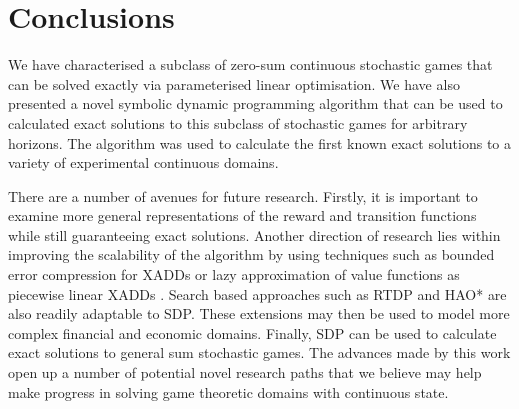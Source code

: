 \section{Conclusions}
\label{sec:conclusion}


We have characterised a subclass of zero-sum continuous stochastic
games that can be solved exactly via parameterised linear optimisation.
We have also presented a novel symbolic dynamic programming 
algorithm that can be used to calculated exact solutions to this subclass
of stochastic games for arbitrary horizons. The algorithm
was used to calculate the first known exact solutions to a variety of 
experimental continuous domains.

%

There are a number of avenues for future research. Firstly, it is important
to examine more general representations of the reward and transition functions while
still guaranteeing exact solutions. Another direction of research lies within
improving the scalability of the algorithm by using techniques such as 
bounded error compression for XADDs \cite{Vianna_UAI_2013} or lazy 
approximation of value functions as piecewise linear XADDs \cite{Li_AAAI_2005}. 
Search based approaches such as RTDP \cite{Barto_AI_1995} and HAO* \cite{Meuleau_JoAIR_2009}
are also readily adaptable to SDP. These extensions may then be used to 
model more complex financial and economic domains. Finally, SDP can be
used to calculate exact solutions to general sum stochastic games. The advances
made by this work open up a number of potential novel research paths
that we believe may help make progress in solving game theoretic domains
with continuous state.
